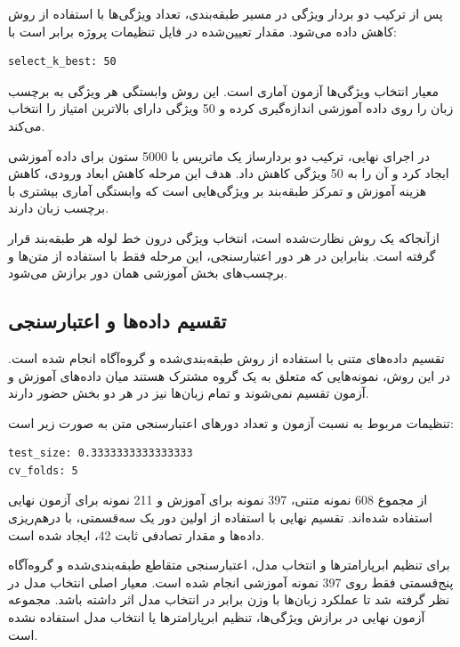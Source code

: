 \documentclass[12pt,a4paper,oneside]{report}
\begin{document}
پس از ترکیب دو بردار ویژگی در مسیر طبقه‌بندی، تعداد ویژگی‌ها با استفاده از روش
کاهش داده می‌شود. مقدار تعیین‌شده در فایل تنظیمات پروژه برابر است با:

\begin{latin}
\begin{verbatim}
select_k_best: 50
\end{verbatim}
\end{latin}

معیار انتخاب ویژگی‌ها آزمون آماری
است. این روش وابستگی هر ویژگی به برچسب زبان را روی داده آموزشی اندازه‌گیری کرده و 50 ویژگی دارای بالاترین امتیاز را انتخاب می‌کند.

در اجرای نهایی، ترکیب دو بردارساز یک ماتریس با 5000 ستون برای داده آموزشی ایجاد کرد و
آن را به 50 ویژگی کاهش داد. هدف این مرحله کاهش ابعاد ورودی، کاهش هزینه آموزش و تمرکز طبقه‌بند بر ویژگی‌هایی است که وابستگی آماری بیشتری با برچسب زبان دارند.

ازآنجاکه
یک روش نظارت‌شده است، انتخاب ویژگی درون خط لوله هر طبقه‌بند قرار گرفته است. بنابراین در هر دور اعتبارسنجی، این مرحله فقط با استفاده از متن‌ها و برچسب‌های بخش آموزشی همان دور برازش می‌شود.


\subsection{تقسیم داده‌ها و اعتبارسنجی}

تقسیم داده‌های متنی با استفاده از روش طبقه‌بندی‌شده و گروه‌آگاه انجام شده است. در این روش، نمونه‌هایی که متعلق به یک گروه مشترک هستند میان داده‌های آموزش و آزمون تقسیم نمی‌شوند و تمام زبان‌ها نیز در هر دو بخش حضور دارند.

تنظیمات مربوط به نسبت آزمون و تعداد دورهای اعتبارسنجی متن به صورت زیر است:

\begin{latin}
\begin{verbatim}
test_size: 0.3333333333333333
cv_folds: 5
\end{verbatim}
\end{latin}

از مجموع 608 نمونه متنی، 397 نمونه برای آموزش و 211 نمونه برای آزمون نهایی استفاده شده‌اند. تقسیم نهایی با استفاده از اولین دور یک
سه‌قسمتی، با درهم‌ریزی داده‌ها و مقدار تصادفی ثابت 42، ایجاد شده است.

برای تنظیم ابرپارامترها و انتخاب مدل، اعتبارسنجی متقاطع طبقه‌بندی‌شده و گروه‌آگاه پنج‌قسمتی فقط روی 397 نمونه آموزشی انجام شده است. معیار اصلی انتخاب مدل
در نظر گرفته شد تا عملکرد زبان‌ها با وزن برابر در انتخاب مدل اثر داشته باشد. مجموعه آزمون نهایی در برازش ویژگی‌ها، تنظیم ابرپارامترها یا انتخاب مدل استفاده نشده است.
\end{document}
